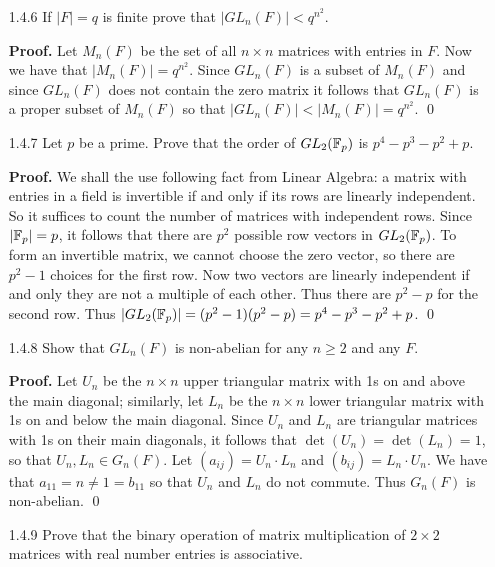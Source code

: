 \begin{enumerate}
      ($\Rightarrow$) We shall instead prove the contrapositive in this
      direction. So suppose $F$ is infinite, so that $F^\times$ is also
      infinite. Then the set $\left\{\left(\begin{tabular}{@{}cc@{}}
         $a$ & 0 \\
         0 & 1
      \end{tabular}\right) : a \in F^\times\right\}$ is not only infinite but 
      also a subset of $GL_n(F)$. Thus $GL_n(F)$ is infinite, as desired. \qed
   \item[1.4.6]   If $|F| = q$ is finite prove that $|GL_n(F)| < q^{n^2}$.
   
      \textbf{Proof.} Let $M_n(F)$ be the set of all $n \times n$ matrices with
      entries in $F$. Now we have that $|M_n(F)| = q^{n^2}$. Since $GL_n(F)$ is
      a subset of $M_n(F)$ and since $GL_n(F)$ does not contain the zero matrix
      it follows that $GL_n(F)$ is a proper subset of $M_n(F)$ so that
      $|GL_n(F)| < |M_n(F)| = q^{n^2}$. \qed
   \item[1.4.7]   Let $p$ be a prime. Prove that the order of $GL_2(\mathbb{F}_p)$ is
                  $p^4 - p^3 - p^2 + p$.
                  
      \textbf{Proof.} We shall the use following fact from Linear Algebra: a
      matrix with entries in a field is invertible if and only if its rows are
      linearly independent. So it suffices to count the number of matrices with
      independent rows. Since $|\mathbb{F}_p| = p$, it follows that there are $p^2$
      possible row vectors in $GL_2(\mathbb{F}_p)$. To form an invertible matrix, we
      cannot choose the zero vector, so there are $p^2 - 1$ choices for the
      first row.  Now two vectors are linearly independent if and only they are
      not a multiple of each other. Thus there are $p^2 - p$ for the second row.
      Thus $|GL_2(\mathbb{F}_p)| = (p^2 - 1)(p^2 - p) = p^4 - p^3 - p^2 + p$. \qed
   \item[1.4.8]   Show that $GL_n(F)$ is non-abelian for any $n \ge 2$ and any
                  $F$.
                  
      \textbf{Proof.} Let $U_n$ be the $n \times n$ upper triangular matrix with
      1s on and above the main diagonal; similarly, let $L_n$ be the
      $n \times n$ lower triangular matrix with 1s on and below the main
      diagonal. Since $U_n$ and $L_n$ are triangular matrices with 1s on their
      main diagonals, it follows that $\det(U_n) = \det(L_n) = 1$, so that
      $U_n, L_n \in G_n(F)$. Let $(a_{ij}) = U_n \cdot L_n$ and
      $(b_{ij}) = L_n \cdot U_n$. We have that $a_{11} = n \neq 1 = b_{11}$ so
      that $U_n$ and $L_n$ do not commute. Thus $G_n(F)$ is non-abelian. \qed
   \item[1.4.9]   Prove that the binary operation of matrix multiplication of
                  $2 \times 2$ matrices with real number entries is associative.
                  

\end{enumerate}
